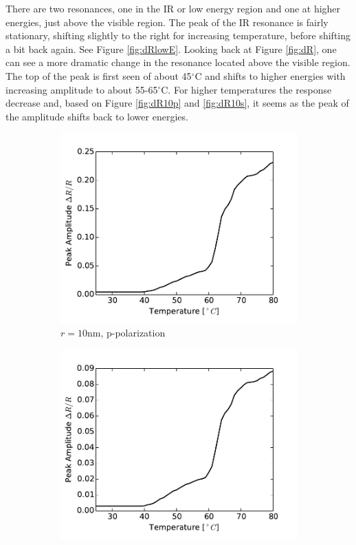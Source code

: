 There are two resonances, one in the IR or low energy region and one at higher energies, just above the
visible region. The peak of the IR resonance is fairly stationary, shifting slightly to the right for 
increasing temperature, before shifting a bit back again. See Figure \ref{fig:dRlowE}. 
Looking back at Figure \ref{fig:dR}, one can see a more dramatic change in the resonance located
above the visible region. The top of the peak is first seen of about 45$^{\circ}$C and shifts to
higher energies with increasing amplitude to about 55-65$^{\circ}$C. For higher temperatures
the response decrease and, based on Figure \ref{fig:dR10p} and \ref{fig:dR10s}, it seems as
the peak of the amplitude shifts back to lower energies.

%
\begin{figure}[h!]
    \centering
    \begin{subfigure}[b]{0.49\textwidth}
        \centering
        \includegraphics[width=\textwidth]{Results/Sim1/dR_IRpeak_amp2.pdf}
        \caption{$r=10$nm, p-polarization}
        \label{fig:IRpeak1}
    \end{subfigure}
    \begin{subfigure}[b]{0.49\textwidth}
        \centering
        \includegraphics[width=\textwidth]{Results/Sim2/dR_IRpeak_amp2.pdf}

\end{subfigure}
\end{figure}
